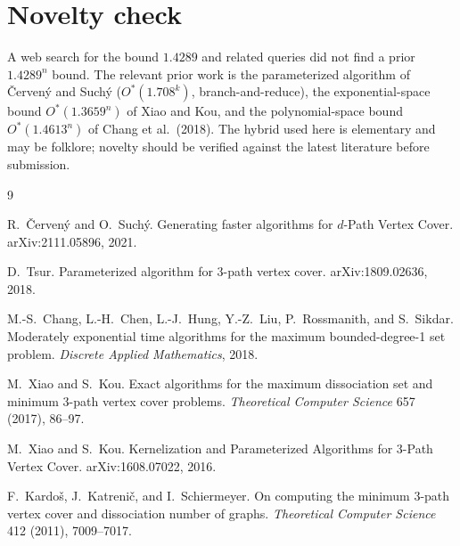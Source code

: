 \documentclass[11pt]{article}
\begin{document}
\section{Novelty check}

A web search for the bound $1.4289$ and related queries did not find a prior
$1.4289^n$ bound. The relevant prior work is the parameterized algorithm of
\v{C}erven\'y and Such\'y ($O^*(1.708^k)$, branch-and-reduce), the exponential-space
bound $O^*(1.3659^n)$ of Xiao and Kou, and the polynomial-space bound
$O^*(1.4613^n)$ of Chang et al.\ (2018). The hybrid used here is elementary and may be
folklore; novelty should be verified against the latest literature before submission.

\begin{thebibliography}{9}

R.~\v{C}erven\'y and O.~Such\'y.
Generating faster algorithms for $d$-Path Vertex Cover.
arXiv:2111.05896, 2021.

D.~Tsur.
Parameterized algorithm for 3-path vertex cover.
arXiv:1809.02636, 2018.

M.-S.~Chang, L.-H.~Chen, L.-J.~Hung, Y.-Z.~Liu, P.~Rossmanith, and S.~Sikdar.
Moderately exponential time algorithms for the maximum bounded-degree-1 set problem.
\emph{Discrete Applied Mathematics}, 2018.

M.~Xiao and S.~Kou.
Exact algorithms for the maximum dissociation set and minimum 3-path vertex cover
problems.
\emph{Theoretical Computer Science} 657 (2017), 86--97.

M.~Xiao and S.~Kou.
Kernelization and Parameterized Algorithms for 3-Path Vertex Cover.
arXiv:1608.07022, 2016.

F.~Kardoš, J.~Katrenič, and I.~Schiermeyer.
On computing the minimum 3-path vertex cover and dissociation number of graphs.
\emph{Theoretical Computer Science} 412 (2011), 7009--7017.

\end{thebibliography}
\end{document}
